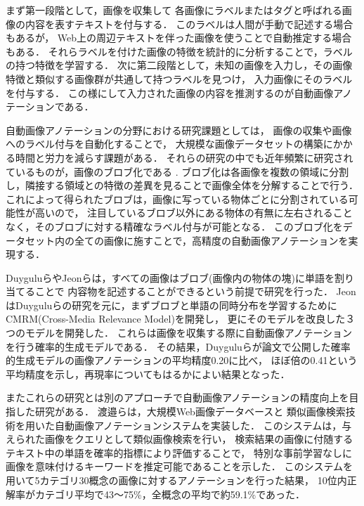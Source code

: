 \documentclass{deimj}
\begin{document}
まず第一段階として，画像を収集して
各画像にラベルまたはタグと呼ばれる画像の内容を表すテキストを付与する．
このラベルは人間が手動で記述する場合もあるが，
Web上の周辺テキストを伴った画像を使うことで自動推定する場合もある．
それらラベルを付けた画像の特徴を統計的に分析することで，ラベルの持つ特徴を学習する．
次に第二段階として，未知の画像を入力し，その画像特徴と類似する画像群が共通して持つラベルを見つけ，
入力画像にそのラベルを付与する．
この様にして入力された画像の内容を推測するのが自動画像アノテーションである．

自動画像アノテーションの分野における研究課題としては，
画像の収集や画像へのラベル付与を自動化することで，
大規模な画像データセットの構築にかかる時間と労力を減らす課題がある．
%
それらの研究の中でも近年頻繁に研究されているものが，画像のブロブ化である
\cite{duygulu,jeon}.
ブロブ化は各画像を複数の領域に分割し，隣接する領域との特徴の差異を見ることで画像全体を分解することで行う．
これによって得られたブロブは，画像に写っている物体ごとに分割されている可能性が高いので，
注目しているブロブ以外にある物体の有無に左右されることなく，そのブロブに対する精確なラベル付与が可能となる．
このブロブ化をデータセット内の全ての画像に施すことで，高精度の自動画像アノテーションを実現する．

Duygulu\cite{duygulu}らやJeon\cite{jeon}らは，すべての画像はブロブ(画像内の物体の塊)に単語を割り当てることで
内容物を記述することができるという前提で研究を行った．
JeonはDuyguluらの研究を元に，まずブロブと単語の同時分布を学習するためにCMRM(Cross-Media Relevance Model)を開発し，
更にそのモデルを改良した３つのモデルを開発した．
これらは画像を収集する際に自動画像アノテーションを行う確率的生成モデルである．
その結果，Duyguluらが論文で公開した確率的生成モデルの画像アノテーションの平均精度0.20に比べ，
ほぼ倍の0.41という平均精度を示し，再現率についてもはるかによい結果となった．

またこれらの研究とは別のアプローチで自動画像アノテーションの精度向上を目指した研究がある．
渡邉ら\cite{watanabe}は，大規模Web画像データベースと
類似画像検索技術を用いた自動画像アノテーションシステムを実装した．
このシステムは，与えられた画像をクエリとして類似画像検索を行い，
検索結果の画像に付随するテキスト中の単語を確率的指標により評価することで，
特別な事前学習なしに画像を意味付けるキーワードを推定可能であることを示した．
このシステムを用いて5カテゴリ30概念の画像に対するアノテーションを行った結果，
10位内正解率がカテゴリ平均で43～75\%，全概念の平均で約59.1\%であった．
\end{document}
